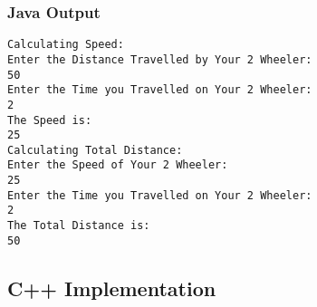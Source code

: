 \documentclass[11pt]{article}
\begin{document}
\subsubsection{Java Output}
\begin{lstlisting}[caption=Java Output for Program 3]
Calculating Speed:
Enter the Distance Travelled by Your 2 Wheeler:
50
Enter the Time you Travelled on Your 2 Wheeler:
2
The Speed is:
25
Calculating Total Distance:
Enter the Speed of Your 2 Wheeler:
25
Enter the Time you Travelled on Your 2 Wheeler:
2
The Total Distance is:
50
\end{lstlisting}

\subsection{C++ Implementation}


\end{document}
